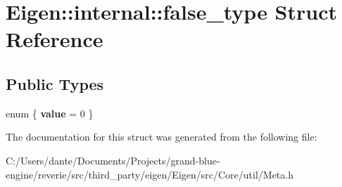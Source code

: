 \hypertarget{struct_eigen_1_1internal_1_1false__type}{}\section{Eigen\+::internal\+::false\+\_\+type Struct Reference}
\label{struct_eigen_1_1internal_1_1false__type}
\subsection*{Public Types}
\begin{DoxyCompactItemize}
\item 
\mbox{\label{struct_eigen_1_1internal_1_1false__type_a7cb992f2ea45747f0ee195f4a3373bb3}} 
enum \{ {\bfseries value} = 0
 \}
\end{DoxyCompactItemize}


The documentation for this struct was generated from the following file\+:\begin{DoxyCompactItemize}
\item 
C\+:/\+Users/dante/\+Documents/\+Projects/grand-\/blue-\/engine/reverie/src/third\+\_\+party/eigen/\+Eigen/src/\+Core/util/Meta.\+h\end{DoxyCompactItemize}
